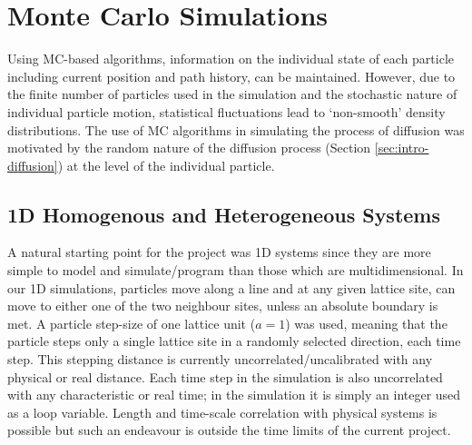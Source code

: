 
\section{Monte Carlo Simulations}
\label{section:mc-sims}

	Using MC-based algorithms, information on the individual state of each particle including current position and path history, can be maintained. However, due to the finite number of particles used in the simulation and the stochastic nature of individual particle motion, statistical fluctuations lead to `non-smooth' density distributions. The use of MC algorithms in simulating the process of diffusion was motivated by the random nature of the diffusion process (Section \ref{sec:intro-diffusion}) at the level of the individual particle.

\subsection{1D Homogenous and Heterogeneous Systems}
\label{section:mc-sims-1D}
	A natural starting point for the project was 1D systems since they are more simple to model and simulate/program than those which are multidimensional. In our 1D simulations, particles move along a line and at any given lattice site, can move to either one of the two neighbour sites, unless an absolute boundary is met. A particle step-size of one lattice unit ($ a = 1 $) was used, meaning that the particle steps only a single lattice site in a randomly selected direction, each time step. This stepping distance is currently uncorrelated/uncalibrated with any physical or real distance. Each time step in the simulation is also uncorrelated with any characteristic or real time; in the simulation it is simply an integer used as a loop variable. Length and time-scale correlation with physical systems is possible but such an endeavour is outside the time limits of the current project.
	
